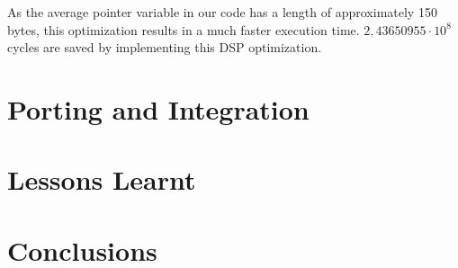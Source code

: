 \documentclass[a4paper]{article}
\begin{document}
As the average pointer variable in our code has a length of approximately 150 bytes, this optimization results in a much faster execution time. $2,43650955\cdot10^{8}$ cycles are saved by implementing this DSP optimization.

\section{Porting and Integration}

\section{Lessons Learnt}

\section{Conclusions}
\end{document}
